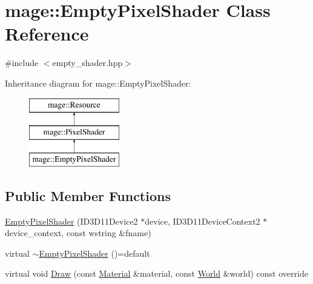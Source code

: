 \hypertarget{classmage_1_1_empty_pixel_shader}{}\section{mage\+:\+:Empty\+Pixel\+Shader Class Reference}
\label{classmage_1_1_empty_pixel_shader}


{\ttfamily \#include $<$empty\+\_\+shader.\+hpp$>$}

Inheritance diagram for mage\+:\+:Empty\+Pixel\+Shader\+:\begin{figure}[H]
\begin{center}
\leavevmode
\includegraphics[height=3.000000cm]{classmage_1_1_empty_pixel_shader}
\end{center}
\end{figure}
\subsection*{Public Member Functions}
\begin{DoxyCompactItemize}
\item 
\hyperlink{classmage_1_1_empty_pixel_shader_a7ef10491614de6eaa31d7845094d34a1}{Empty\+Pixel\+Shader} (I\+D3\+D11\+Device2 $\ast$device, I\+D3\+D11\+Device\+Context2 $\ast$device\+\_\+context, const wstring \&fname)
\item 
virtual \hyperlink{classmage_1_1_empty_pixel_shader_ace5053e12d6fa60caa2bcca00d192fab}{$\sim$\+Empty\+Pixel\+Shader} ()=default
\item 
virtual void \hyperlink{classmage_1_1_empty_pixel_shader_ababff79ea9746a94b838bb2f8dfd1fbf}{Draw} (const \hyperlink{structmage_1_1_material}{Material} \&material, const \hyperlink{classmage_1_1_world}{World} \&world) const override
\end{DoxyCompactItemize}

